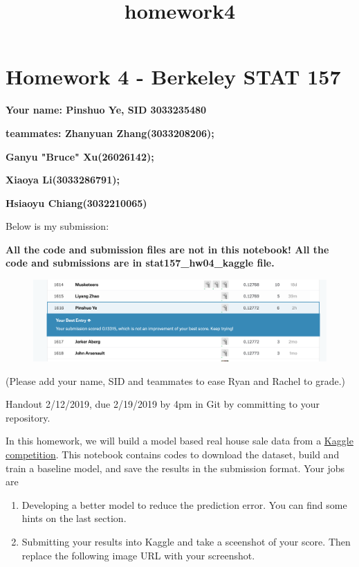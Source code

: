 \documentclass[11pt]{article}
\title{homework4}
\makeatletter
\def\maxwidth{\ifdim\Gin@nat@width>\linewidth\linewidth
    \else\Gin@nat@width\fi}
\let\Oldincludegraphics\includegraphics
\renewcommand{\includegraphics}[1]{\Oldincludegraphics[width=.8\maxwidth]{#1}}
\makeatother
\begin{document}
    
    
    \maketitle
    
    

    
    \section{Homework 4 - Berkeley STAT
157}\label{homework-4---berkeley-stat-157}

\textbf{Your name: Pinshuo Ye, SID 3033235480}

\textbf{teammates: Zhanyuan Zhang(3033208206);}

\textbf{Ganyu "Bruce" Xu(26026142);}

\textbf{Xiaoya Li(3033286791);}

\textbf{Hsiaoyu Chiang(3032210065)}

Below is my submission:

\textbf{All the code and submission files are not in this notebook! All
the code and submissions are in stat157\_hw04\_kaggle file.}

\begin{figure}
\centering
\includegraphics{competition.png}
\caption{}
\end{figure}

    (Please add your name, SID and teammates to ease Ryan and Rachel to
grade.)

Handout 2/12/2019, due 2/19/2019 by 4pm in Git by committing to your
repository.

In this homework, we will build a model based real house sale data from
a
\href{https://www.kaggle.com/c/house-prices-advanced-regression-techniques}{Kaggle
competition}. This notebook contains codes to download the dataset,
build and train a baseline model, and save the results in the submission
format. Your jobs are

\begin{enumerate}
\def\labelenumi{\arabic{enumi}.}
\item
  Developing a better model to reduce the prediction error. You can find
  some hints on the last section.
\item
  Submitting your results into Kaggle and take a sceenshot of your
  score. Then replace the following image URL with your screenshot.
\end{enumerate}
\end{document}
